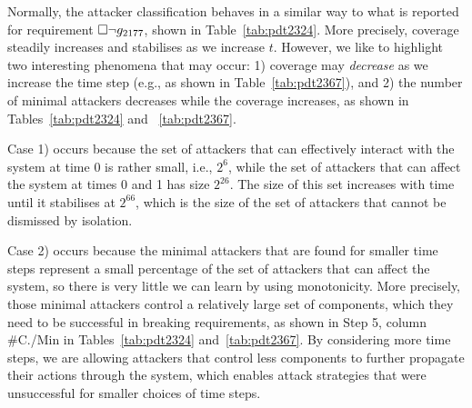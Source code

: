 {Normally, the attacker classification behaves in a similar way to what is reported for requirement $ {{\square}} \lnot g_{2177}$, shown in Table~\ref{tab:pdt2324}. More precisely, coverage steadily increases and stabilises as we increase $t$. However, we like to highlight two interesting phenomena that may occur: 1) coverage {may} \emph{decrease} as we increase the time step (e.g., as shown in Table~\ref{tab:pdt2367}), and 2) the number of minimal attackers decreases while the coverage increases, as shown in Tables~\ref{tab:pdt2324} and ~\ref{tab:pdt2367}. 


Case 1) occurs because the set of attackers that can effectively interact with the system at time 0 is rather small, i.e., $2^6$, while the set of attackers that can affect the system at times 0 and 1 has size $2^{26}$. The size of this set increases with time until it stabilises at $2^{66}$, which is the size of the set of attackers that cannot be dismissed by isolation. 

Case 2) occurs because the minimal attackers that are found for smaller time steps represent a small percentage of the set of attackers that can affect the system, so there is very little we can learn by using monotonicity. More precisely, those minimal attackers control a relatively large set of components, which they need to be successful in breaking requirements, as shown in Step 5, column \#C./Min in Tables~\ref{tab:pdt2324} and~\ref{tab:pdt2367}. By considering more time steps, we are allowing attackers that control less components to further propagate their actions through the system, which enables attack strategies that were unsuccessful for smaller choices of time steps.

}

